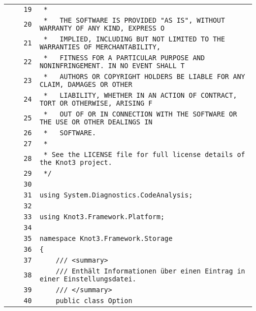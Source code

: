 \documentclass[a4paper,10pt]{article}
\begin{document}
\begin{longtable}[l]{lrrl}
\cellcolor{gray} &  & \verb~19~ & \verb~ *~\\
\cellcolor{gray} &  & \verb~20~ & \verb~ *   THE SOFTWARE IS PROVIDED "AS IS", WITHOUT WARRANTY OF ANY KIND, EXPRESS O~\\
\cellcolor{gray} &  & \verb~21~ & \verb~ *   IMPLIED, INCLUDING BUT NOT LIMITED TO THE WARRANTIES OF MERCHANTABILITY,~\\
\cellcolor{gray} &  & \verb~22~ & \verb~ *   FITNESS FOR A PARTICULAR PURPOSE AND NONINFRINGEMENT. IN NO EVENT SHALL T~\\
\cellcolor{gray} &  & \verb~23~ & \verb~ *   AUTHORS OR COPYRIGHT HOLDERS BE LIABLE FOR ANY CLAIM, DAMAGES OR OTHER~\\
\cellcolor{gray} &  & \verb~24~ & \verb~ *   LIABILITY, WHETHER IN AN ACTION OF CONTRACT, TORT OR OTHERWISE, ARISING F~\\
\cellcolor{gray} &  & \verb~25~ & \verb~ *   OUT OF OR IN CONNECTION WITH THE SOFTWARE OR THE USE OR OTHER DEALINGS IN~\\
\cellcolor{gray} &  & \verb~26~ & \verb~ *   SOFTWARE.~\\
\cellcolor{gray} &  & \verb~27~ & \verb~ *~\\
\cellcolor{gray} &  & \verb~28~ & \verb~ * See the LICENSE file for full license details of the Knot3 project.~\\
\cellcolor{gray} &  & \verb~29~ & \verb~ */~\\
\cellcolor{gray} &  & \verb~30~ & \verb~~\\
\cellcolor{gray} &  & \verb~31~ & \verb~using System.Diagnostics.CodeAnalysis;~\\
\cellcolor{gray} &  & \verb~32~ & \verb~~\\
\cellcolor{gray} &  & \verb~33~ & \verb~using Knot3.Framework.Platform;~\\
\cellcolor{gray} &  & \verb~34~ & \verb~~\\
\cellcolor{gray} &  & \verb~35~ & \verb~namespace Knot3.Framework.Storage~\\
\cellcolor{gray} &  & \verb~36~ & \verb~{~\\
\cellcolor{gray} &  & \verb~37~ & \verb~    /// <summary>~\\
\cellcolor{gray} &  & \verb~38~ & \verb~    /// Enthält Informationen über einen Eintrag in einer Einstellungsdatei.~\\
\cellcolor{gray} &  & \verb~39~ & \verb~    /// </summary>~\\
\cellcolor{gray} &  & \verb~40~ & \verb~    public class Option~\\

\end{longtable}
\end{document}
